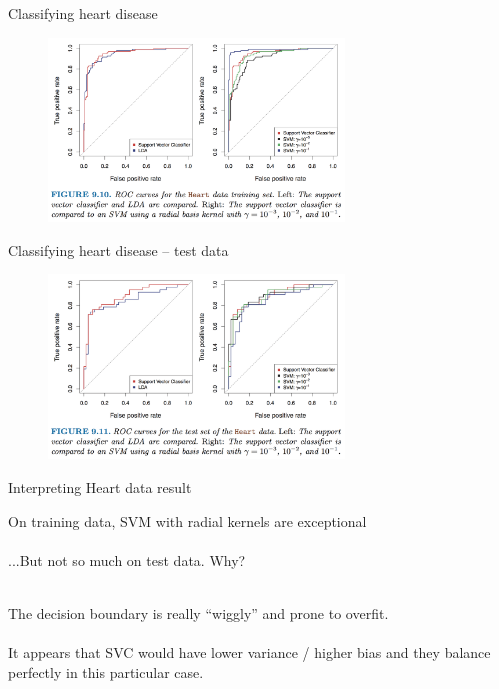 \documentclass[mathserif, aspectratio=169]{beamer}
\begin{document}
\begin{frame}{Classifying heart disease}
	\begin{figure}
		\includegraphics[width=0.7\textwidth]{fig9_10}
		\caption*{}
	\end{figure}
\end{frame}

\begin{frame}{Classifying heart disease -- test data}
	\begin{figure}
		\includegraphics[width=0.7\textwidth]{fig9_11}
		\caption*{}
	\end{figure}
\end{frame}

\begin{frame}{Interpreting Heart data result}

	On training data, SVM with radial kernels are exceptional \\~\\

	...But not so much on test data.  Why?\\~\\
	\pause

	The decision boundary is really ``wiggly'' and prone to overfit. \\~\\

	It appears that SVC would have lower variance / higher bias and they balance perfectly in  this particular case.

\end{frame}
\end{document}
